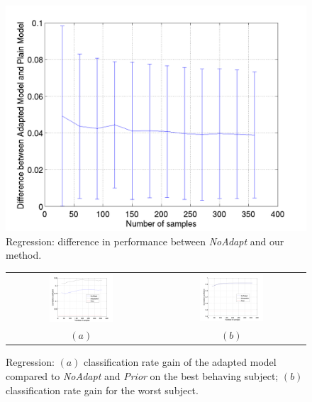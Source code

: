 \begin{figure}[ht]
  \centering
  \includegraphics[width=0.95\linewidth]{figs/exp2}
  \caption{Regression: difference in performance between
    \emph{NoAdapt} and our method.}
  \label{fig:diff_reg}
\end{figure}

\begin{figure}[ht] \centering
  \begin{tabular}{cc}
    \includegraphics[width=0.45\textwidth]{figs/exp2_abs_best} &
    \includegraphics[width=0.45\textwidth]{figs/exp2_abs_worst} \\
    $(a)$ & $(b)$ \\
  \end{tabular}
  \caption{Regression: $(a)$ classification rate gain
    of the adapted model compared to \emph{NoAdapt} and \emph{Prior}
    on the best behaving subject; $(b)$ classification rate gain for
    the worst subject.}
  \label{fig:reg_abs}
\end{figure}
